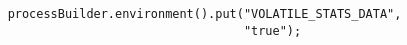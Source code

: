 \begin{verbatim}
    processBuilder.environment().put("VOLATILE_STATS_DATA", 
                                     "true");
\end{verbatim}